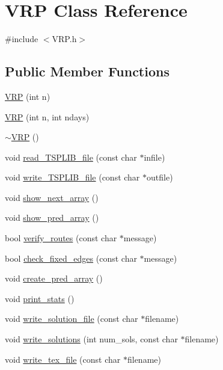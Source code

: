 \hypertarget{class_v_r_p}{
\section{VRP Class Reference}
\label{class_v_r_p}
}


{\ttfamily \#include $<$VRP.h$>$}

\subsection*{Public Member Functions}
\begin{DoxyCompactItemize}
\item 
\hyperlink{class_v_r_p_aea92b2395b85af8de610684eba870e52}{VRP} (int n)
\item 
\hyperlink{class_v_r_p_a696a3111d2a8cc4495bf75f8e0bb4564}{VRP} (int n, int ndays)
\item 
\hyperlink{class_v_r_p_a78e9e0bdcba60d1f3f69df96d0d88e1b}{$\sim$VRP} ()
\item 
void \hyperlink{class_v_r_p_a484362e33edbb65b0015b82b60740817}{read\_\-TSPLIB\_\-file} (const char $\ast$infile)
\item 
void \hyperlink{class_v_r_p_aae4bfa00f65383453b3d86a0e63a5f78}{write\_\-TSPLIB\_\-file} (const char $\ast$outfile)
\item 
void \hyperlink{class_v_r_p_ada636b72ffc5ea0831bd083b408ada37}{show\_\-next\_\-array} ()
\item 
void \hyperlink{class_v_r_p_adb428999690dc1538a9136be2fc4a545}{show\_\-pred\_\-array} ()
\item 
bool \hyperlink{class_v_r_p_a5e3e1361a093bd343ce5cdc51d20857d}{verify\_\-routes} (const char $\ast$message)
\item 
bool \hyperlink{class_v_r_p_af00d2002e90f65c8dd86e37228134779}{check\_\-fixed\_\-edges} (const char $\ast$message)
\item 
void \hyperlink{class_v_r_p_aaa5bdbb47495253df1a26d38db0f5b32}{create\_\-pred\_\-array} ()
\item 
void \hyperlink{class_v_r_p_aa1fecc4f90a6cd959205eb8f244148da}{print\_\-stats} ()
\item 
void \hyperlink{class_v_r_p_a53325e48991274fa0e36efd92abbf868}{write\_\-solution\_\-file} (const char $\ast$filename)
\item 
void \hyperlink{class_v_r_p_a8db444175bfce88c819fe551ac2c2392}{write\_\-solutions} (int num\_\-sols, const char $\ast$filename)
\item 
void \hyperlink{class_v_r_p_a5e08e9d713236b6fa098ed9ed2aeb180}{write\_\-tex\_\-file} (const char $\ast$filename)

\end{DoxyCompactItemize}
